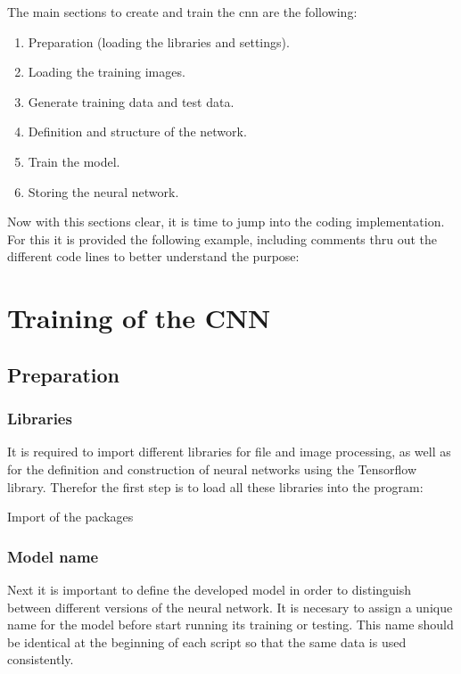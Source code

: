 The main sections to create and train the \ac{cnn} are the following:  

\begin{enumerate}
	\item Preparation (loading the libraries and settings).
	\item Loading the training images.
	\item Generate training data and test data.
	\item Definition and structure of the network.
	\item Train the model.
	\item Storing the neural network.
\end{enumerate}

Now with this sections clear, it is time to jump into the coding implementation. For this it is provided the following example, including comments thru out the different code lines to better understand the purpose: 

\section{Training of the CNN}


\subsection{Preparation}

\subsubsection{Libraries}

It is required to import different libraries for file and image processing, as well as for the definition
and construction of neural networks using the Tensorflow library. Therefor the first step is to load
all these libraries into the program:

\begin{code}
      

  \caption{Import of the packages} 
    
\end{code}    

\subsubsection{Model name}

Next it is important to define the developed model in order to distinguish between different versions
of the neural network. It is necesary to assign a unique name for the model before start running
its training or testing. This name should be identical at the beginning of each script so that the
same data is used consistently.

